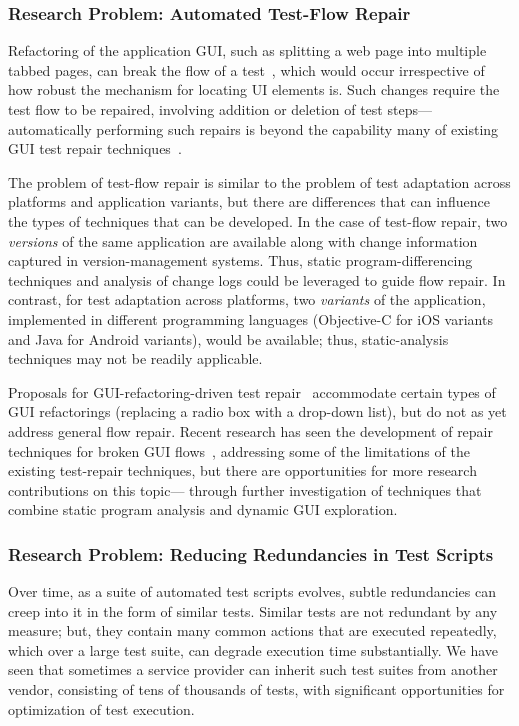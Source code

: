\subsubsection*{Research Problem: Automated Test-Flow Repair}

Refactoring of the application GUI, such as splitting a web page into multiple
tabbed pages, can break the flow of a test~\cite{thummalapenta:2013a}, which
would occur irrespective of how robust the mechanism for locating UI elements
is. Such changes require the test flow to be repaired, involving addition or
deletion of test steps---automatically performing such repairs is beyond the
capability many of existing GUI test repair techniques~\cite{Choudhary:2011,
  Grechanik:2009, Memon:2008}.

The problem of test-flow repair is similar to the problem of test adaptation
across platforms and application variants, but there are differences that can
influence the types of techniques that can be developed. In the case of
test-flow repair, two \textit{versions} of the same application are available
along with change information captured in version-management systems. Thus,
static program-differencing techniques and analysis of change logs could be
leveraged to guide flow repair. In contrast, for test adaptation across
platforms, two \textit{variants} of the application, implemented in different
programming languages (\eg Objective-C for iOS variants and Java for Android
variants), would be available; thus, static-analysis techniques may not be
readily applicable.

Proposals for GUI-refactoring-driven test repair~\cite{Daniel2011} accommodate
certain types of GUI refactorings (\eg replacing a radio box with a drop-down
list), but do not as yet address general flow repair.  Recent research has seen
the development of repair techniques for broken GUI flows~\cite{Zhang2013},
addressing some of the limitations of the existing test-repair techniques, but
there are opportunities for more research contributions on this topic---\eg
through further investigation of techniques that combine static program analysis
and dynamic GUI exploration.

\subsubsection*{Research Problem: Reducing Redundancies in Test Scripts}

Over time, as a suite of automated test scripts evolves, subtle redundancies can
creep into it in the form of similar tests. Similar tests are not redundant by
any measure; but, they contain many common actions that are executed repeatedly,
which over a large test suite, can degrade execution time substantially.  We
have seen that sometimes a service provider can inherit such test suites from
another vendor, consisting of tens of thousands of tests, with significant
opportunities for optimization of test execution.

